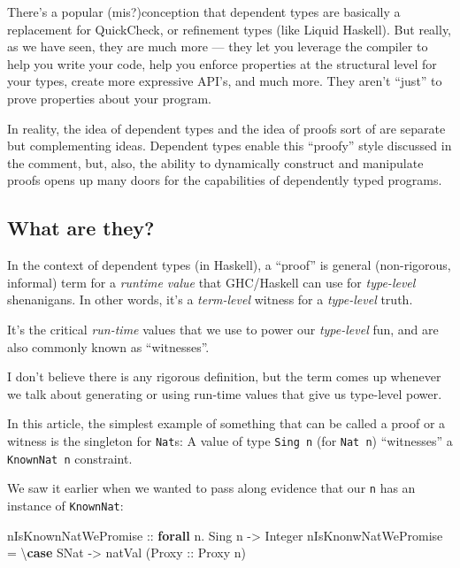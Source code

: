 \documentclass[]{article}
\newenvironment{Shaded}{}{}
\newcommand{\DataTypeTok}[1]{\textcolor[rgb]{0.56,0.13,0.00}{#1}}
\newcommand{\KeywordTok}[1]{\textcolor[rgb]{0.00,0.44,0.13}{\textbf{#1}}}
\newcommand{\NormalTok}[1]{#1}
\newcommand{\OperatorTok}[1]{\textcolor[rgb]{0.40,0.40,0.40}{#1}}
\newcommand{\OtherTok}[1]{\textcolor[rgb]{0.00,0.44,0.13}{#1}}
\begin{document}
There's a popular (mis?)conception that dependent types are basically a
replacement for QuickCheck, or refinement types (like Liquid Haskell). But
really, as we have seen, they are much more --- they let you leverage the
compiler to help you write your code, help you enforce properties at the
structural level for your types, create more expressive API's, and much more.
They aren't ``just'' to prove properties about your program.

In reality, the idea of dependent types and the idea of proofs sort of are
separate but complementing ideas. Dependent types enable this ``proofy'' style
discussed in the comment, but, also, the ability to dynamically construct and
manipulate proofs opens up many doors for the capabilities of dependently typed
programs.

\hypertarget{what-are-they}{%
\subsection{What are they?}\label{what-are-they}}

In the context of dependent types (in Haskell), a ``proof'' is general
(non-rigorous, informal) term for a \emph{runtime value} that GHC/Haskell can
use for \emph{type-level} shenanigans. In other words, it's a \emph{term-level}
witness for a \emph{type-level} truth.

It's the critical \emph{run-time} values that we use to power our
\emph{type-level} fun, and are also commonly known as ``witnesses''.

I don't believe there is any rigorous definition, but the term comes up whenever
we talk about generating or using run-time values that give us type-level power.

In this article, the simplest example of something that can be called a proof or
a witness is the singleton for \texttt{Nat}s: A value of type \texttt{Sing\ n}
(for \texttt{Nat\ n}) ``witnesses'' a \texttt{KnownNat\ n} constraint.

We saw it earlier when we wanted to pass along evidence that our \texttt{n} has
an instance of \texttt{KnownNat}:

\begin{Shaded}
\begin{Highlighting}[]
\OtherTok{nIsKnownNatWePromise ::} \KeywordTok{forall}\NormalTok{ n}\OperatorTok{.} \DataTypeTok{Sing}\NormalTok{ n }\OtherTok{{-}>} \DataTypeTok{Integer}
\NormalTok{nIsKnonwNatWePromise }\OtherTok{=}\NormalTok{ \textbackslash{}}\KeywordTok{case}
    \DataTypeTok{SNat} \OtherTok{{-}>}\NormalTok{ natVal (}\DataTypeTok{Proxy}\OtherTok{ ::} \DataTypeTok{Proxy}\NormalTok{ n)}
\end{Highlighting}
\end{Shaded}
\end{document}
